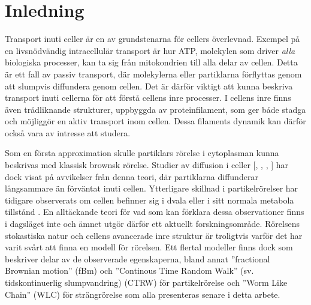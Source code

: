 \chapter{Inledning}



Transport inuti celler är en av grundstenarna för cellers överlevnad. Exempel på en livsnödvändig intracellulär transport är hur ATP, molekylen som driver \emph{alla} biologiska processer, kan ta sig från mitokondrien till alla delar av cellen. Detta är ett fall av passiv transport, där molekylerna eller partiklarna förflyttas genom att slumpvis diffundera genom cellen. Det är därför viktigt att kunna beskriva transport inuti cellerna för att förstå cellens inre processer.
I cellens inre finns även trådliknande strukturer, uppbyggda av proteinfilament, som ger både stadga och möjliggör en aktiv transport inom cellen. Dessa filaments dynamik kan därför också vara av intresse att studera.


Som en första approximation skulle partiklars rörelse i cytoplasman kunna beskrivas med klassisk brownsk rörelse. Studier av diffusion i celler [\cite{Hofling&Franosch2013}, \cite{Dix_Crowdingeffects2008}, \cite{Gou_etal2014}, \cite{Parry_etal2014}] har dock visat på avvikelser från denna teori, där partiklarna diffunderar långsammare än förväntat inuti cellen. Ytterligare skillnad i partikelrörelser har tidigare observerats om cellen befinner sig i dvala eller i sitt normala metabola tillstånd \cite{Parry_etal2014}. En alltäckande teori för vad som kan förklara dessa observationer finns i dagsläget inte och ämnet utgör därför ett aktuellt forskningsområde. Rörelsens stokastiska natur och cellens avancerade inre struktur är troligtvis varför det har varit svårt att finna en modell för rörelsen. Ett flertal modeller finns dock som beskriver delar av de observerade egenskaperna, bland annat ''fractional Brownian motion'' (fBm) \cite{Mandelbrot_fBm1968} och ''Continous Time Random Walk'' (sv. tidskontinuerlig slumpvandring) (CTRW) \cite{Hofling&Franosch2013} för partikelrörelse och ''Worm Like Chain'' (WLC) \cite{Milstein2013} för strängrörelse som alla presenteras senare i detta arbete.


